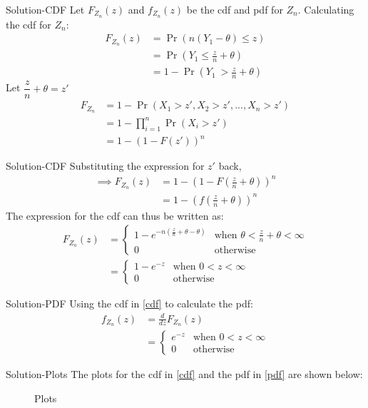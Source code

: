 \documentclass{beamer}
\providecommand{\brak}[1]{\ensuremath{\left(#1\right)}}
\providecommand{\pr}[1]{\ensuremath{\Pr\left(#1\right)}}
\begin{document}
\begin{frame}{Solution-CDF}
Let $F_{Z_n}(z)$ and $f_{Z_n}(z)$ be the cdf and pdf for $Z_n$. Calculating the cdf for $Z_n$:
\begin{align}
    F_{Z_n}(z) &= \pr{n(Y_1-\theta)\leq z}\\
    &= \pr{Y_1\leq \frac{z}{n} +\theta}\\
    &= 1-\pr{Y_1\ > \frac{z}{n} +\theta}
\end{align}
Let $\dfrac{z}{n}+\theta=z'$
\begin{align}
    F_{Z_n}&= 1-\pr{X_1>z', X_2>z', ..., X_n>z'}\\
    &= 1-\prod_{i=1}^{n}\pr{X_i>z'}\\
    &= 1-\brak{1-F(z')}^n
\end{align}
\end{frame}

\begin{frame}{Solution-CDF}
    Substituting the expression for $z'$ back,
    \begin{align}
        \implies F_{Z_n}(z) &= 1-\brak{1-F\brak{\frac{z}{n}+\theta}}^n\label{eq_3}\\
    &=1-\brak{f\brak{\frac{z}{n}+\theta}}^n 
    \end{align}
    The expression for the cdf can thus be written as:
\begin{align}
    F_{Z_n}(z) &=
    \begin{cases}
    1-e^{-n\brak{\frac{z}{n}+\theta-\theta}}&\text{when } \theta<\frac{z}{n}+\theta<\infty\\
    0&\text{otherwise}
    \end{cases}\\
    &= \begin{cases}
    1-e^{-z}&\text{when } 0<z<\infty\\
    0 &\text{otherwise}\label{cdf}
    \end{cases}
\end{align}
\end{frame}

\begin{frame}{Solution-PDF}
    Using the cdf in \eqref{cdf} to calculate the pdf:\\
\begin{align}
    f_{Z_n}(z) &= \frac{d}{dz}F_{Z_n}(z)\\
    &=\begin{cases}
    e^{-z}&\text{when } 0<z<\infty\\
    0&\text{otherwise}
    \end{cases}\label{pdf}
\end{align}
\end{frame}
\begin{frame}{Solution-Plots}
The plots for the cdf in \eqref{cdf} and the pdf in \eqref{pdf} are shown below:
 \begin{figure}%
    \centering
    \qquad
    \caption{Plots}%
    \label{fig:example}%
 
\end{figure}
    
\end{frame}
\end{document}
